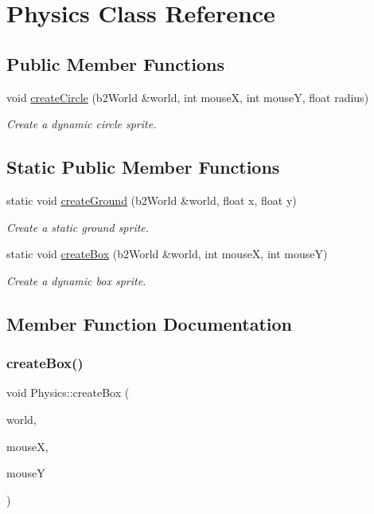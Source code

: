 \hypertarget{class_physics}{}\section{Physics Class Reference}
\label{class_physics}
\subsection*{Public Member Functions}
\begin{DoxyCompactItemize}
\item 
void \hyperlink{class_physics_aa96588091a5f548bcbd3e93930bec919}{create\+Circle} (b2\+World \&world, int mouseX, int mouseY, float radius)
\begin{DoxyCompactList}\small\item\em Create a dynamic circle sprite. \end{DoxyCompactList}\end{DoxyCompactItemize}
\subsection*{Static Public Member Functions}
\begin{DoxyCompactItemize}
\item 
static void \hyperlink{class_physics_af59917c046b199565db48749b67e40b9}{create\+Ground} (b2\+World \&world, float x, float y)
\begin{DoxyCompactList}\small\item\em Create a static ground sprite. \end{DoxyCompactList}\item 
static void \hyperlink{class_physics_ada8fc01ca58dca7c2dc221a73f9816ec}{create\+Box} (b2\+World \&world, int mouseX, int mouseY)
\begin{DoxyCompactList}\small\item\em Create a dynamic box sprite. \end{DoxyCompactList}\end{DoxyCompactItemize}


\subsection{Member Function Documentation}
\mbox{\label{class_physics_ada8fc01ca58dca7c2dc221a73f9816ec}} 
\subsubsection{\texorpdfstring{create\+Box()}{createBox()}}
{\footnotesize\ttfamily void Physics\+::create\+Box (\begin{DoxyParamCaption}\item[{b2\+World \&}]{world,  }\item[{int}]{mouseX,  }\item[{int}]{mouseY }\end{DoxyParamCaption})\hspace{0.3cm}{\ttfamily [static]}}



